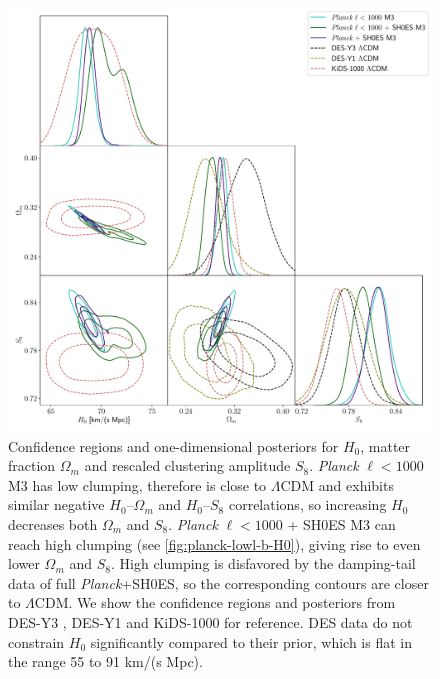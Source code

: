 \begin{figure}[p!]
\includegraphics[width=\textwidth]{img/planck-combined-matter-clustering.pdf}
\caption[Confidence regions and one-dimensional posteriors for $H_0$, matter fraction $\Omega_m$ and rescaled clustering amplitude $S_8$]{Confidence regions and one-dimensional posteriors for $H_0$, matter fraction $\Omega_m$ and rescaled clustering amplitude $S_8$.
{\it Planck} $\ell<1000$ M3 has low clumping, therefore is close to $\Lambda$CDM and exhibits similar negative $H_0$--$\Omega_m$ and $H_0$--$S_8$ correlations, so increasing $H_0$ decreases both $\Omega_m$ and $S_8$.
{\it Planck} $\ell<1000$ + SH0ES M3 can reach high clumping (see \cref{fig:planck-lowl-b-H0}), giving rise to even lower $\Omega_m$ and $S_8$.
High clumping is disfavored by the damping-tail data of full {\it Planck}+SH0ES, so the corresponding contours are closer to $\Lambda$CDM.
We show the confidence regions and posteriors from DES-Y3 \citep{DES-Y3}, DES-Y1 \citep{DES-Y1} and KiDS-1000 \citep{KiDS-1000} for reference.
DES data do not constrain $H_0$ significantly compared to their prior, which is flat in the range 55 to 91 km/(s Mpc).}
\label{fig:planck-combined-matter-clustering}
\end{figure}

